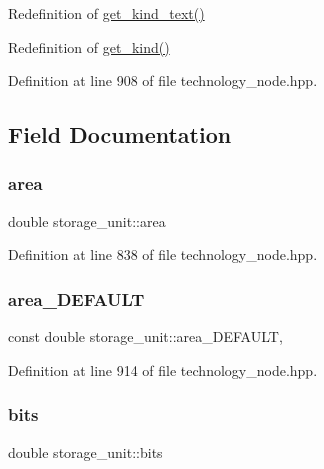 Redefinition of \hyperlink{structtechnology__node_a4b8785a8d6c2db19e1bec0d3eef5c8f2}{get\+\_\+kind\+\_\+text()} 

Redefinition of \hyperlink{structtechnology__node_addc44daafd369586b8cee878d4df5e12}{get\+\_\+kind()} 

Definition at line 908 of file technology\+\_\+node.\+hpp.



\subsection{Field Documentation}
\mbox{\label{structstorage__unit_a6167f604db37a9d99fef52573443001f}} 
\subsubsection{\texorpdfstring{area}{area}}
{\footnotesize\ttfamily double storage\+\_\+unit\+::area}



Definition at line 838 of file technology\+\_\+node.\+hpp.

\mbox{\label{structstorage__unit_abb6b467e602b893508552d0d91e257de}} 
\subsubsection{\texorpdfstring{area\+\_\+\+D\+E\+F\+A\+U\+LT}{area\_DEFAULT}}
{\footnotesize\ttfamily const double storage\+\_\+unit\+::area\+\_\+\+D\+E\+F\+A\+U\+LT\hspace{0.3cm}{\ttfamily [static]}, {\ttfamily [private]}}



Definition at line 914 of file technology\+\_\+node.\+hpp.

\mbox{\label{structstorage__unit_a29869aa61205e453a6382fe2ff83fd31}} 
\subsubsection{\texorpdfstring{bits}{bits}}
{\footnotesize\ttfamily double storage\+\_\+unit\+::bits}



